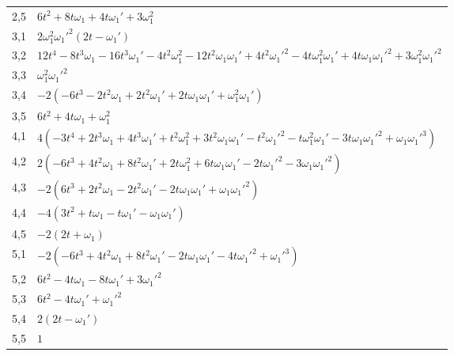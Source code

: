 \documentclass[11pt]{article}
\begin{document}
{\begin{longtable}{cp{13.5cm}}
2,5 & $6 t^{2} + 8 t \omega_1 + 4 t \omega_1' + 3 \omega_1^{2}$ \\
3,1 & $2 \omega_1^{2} \omega_1'^{2} (2 t - \omega_1')$ \\
3,2 & $12 t^{4} - 8 t^{3} \omega_1 - 16 t^{3} \omega_1' - 4 t^{2} \omega_1^{2} - 12 t^{2} \omega_1 \omega_1' + 4 t^{2} \omega_1'^{2} - 4 t \omega_1^{2} \omega_1' + 4 t \omega_1 \omega_1'^{2} + 3 \omega_1^{2} \omega_1'^{2}$ \\
3,3 & $\omega_1^{2} \omega_1'^{2}$ \\
3,4 & $-2 (-6 t^{3} - 2 t^{2} \omega_1 + 2 t^{2} \omega_1' + 2 t \omega_1 \omega_1' + \omega_1^{2} \omega_1')$ \\
3,5 & $6 t^{2} + 4 t \omega_1 + \omega_1^{2}$ \\
4,1 & $4 (-3 t^{4} + 2 t^{3} \omega_1 + 4 t^{3} \omega_1' + t^{2} \omega_1^{2} + 3 t^{2} \omega_1 \omega_1' - t^{2} \omega_1'^{2} - t \omega_1^{2} \omega_1' - 3 t \omega_1 \omega_1'^{2} + \omega_1 \omega_1'^{3})$ \\
4,2 & $2 (-6 t^{3} + 4 t^{2} \omega_1 + 8 t^{2} \omega_1' + 2 t \omega_1^{2} + 6 t \omega_1 \omega_1' - 2 t \omega_1'^{2} - 3 \omega_1 \omega_1'^{2})$ \\
4,3 & $-2 (6 t^{3} + 2 t^{2} \omega_1 - 2 t^{2} \omega_1' - 2 t \omega_1 \omega_1' + \omega_1 \omega_1'^{2})$ \\
4,4 & $-4 (3 t^{2} + t \omega_1 - t \omega_1' - \omega_1 \omega_1')$ \\
4,5 & $-2 (2 t + \omega_1)$ \\
5,1 & $-2 (-6 t^{3} + 4 t^{2} \omega_1 + 8 t^{2} \omega_1' - 2 t \omega_1 \omega_1' - 4 t \omega_1'^{2} + \omega_1'^{3})$ \\
5,2 & $6 t^{2} - 4 t \omega_1 - 8 t \omega_1' + 3 \omega_1'^{2}$ \\
5,3 & $6 t^{2} - 4 t \omega_1' + \omega_1'^{2}$ \\
5,4 & $2 (2 t - \omega_1')$ \\
5,5 & $1$ \\
\end{longtable}}
\end{document}
